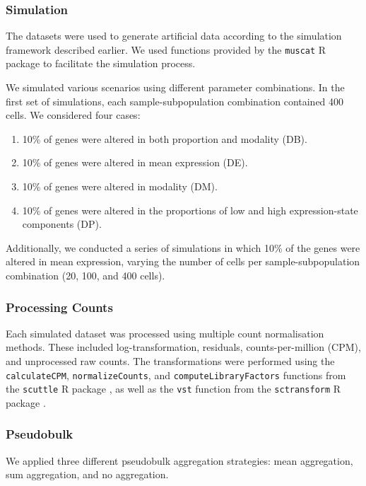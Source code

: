 \documentclass[a4paper, 11pt, twocolumn]{article}
\begin{document}
\begin{multicols}{2}
\subsubsection{Simulation}

The datasets were used to generate artificial data according to the simulation framework described earlier. We used functions provided by the \texttt{muscat} R package \citep{muscat} to facilitate the simulation process.

We simulated various scenarios using different parameter combinations. In the first set of simulations, each sample-subpopulation combination contained 400 cells. We considered four cases:
\begin{enumerate}[itemsep=0pt, topsep=0pt]
	\item 10\% of genes were altered in both proportion and modality (DB).
	\item 10\% of genes were altered in mean expression (DE).
	\item 10\% of genes were altered in modality (DM).
	\item 10\% of genes were altered in the proportions of low and high expression-state components (DP).
\end{enumerate}

Additionally, we conducted a series of simulations in which 10\% of the genes were altered in mean expression, varying the number of cells per sample-subpopulation combination (20, 100, and 400 cells).

\subsubsection{Processing Counts}

Each simulated dataset was processed using multiple count normalisation methods. These included log-transformation, residuals, counts-per-million (CPM), and unprocessed raw counts. The transformations were performed using the \texttt{calculateCPM}, \texttt{normalizeCounts}, and \texttt{computeLibraryFactors} functions from the \texttt{scuttle} R package \citep{scatter}, as well as the \texttt{vst} function from the \texttt{sctransform} R package \citep{sctrans}.

\subsubsection{Pseudobulk}

We applied three different pseudobulk aggregation strategies: mean aggregation, sum aggregation, and no aggregation.


\end{multicols}
\end{document}
